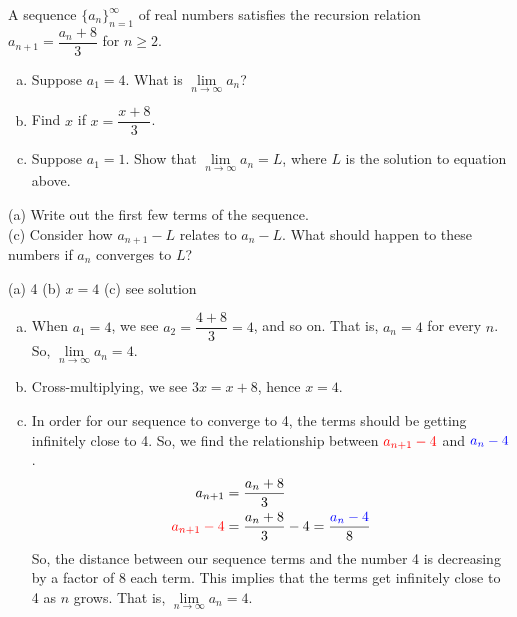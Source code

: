 \begin{question}
A sequence $\big\{a_n\big\}_{n=1}^\infty$ of real numbers satisfies the
recursion relation $a_{n+1} = \dfrac{a_n+8}{3}$ for $n\ge 2$.
\begin{enumerate}[(a)]
\item Suppose $a_1=4$. What is $\lim\limits_{n \to \infty}a_n$?
\item Find $x$ if  $x=\dfrac{x+8}{3}$.
\item Suppose $a_1=1$. Show that $\lim\limits_{n\rightarrow\infty} a_n = L$,
where $L$ is the solution to equation above.
\end{enumerate}
\end{question}

\begin{hint}
(a) Write out the first few terms of the sequence.\\
(c) Consider how $a_{n+1}-L$ relates to $a_{n}-L$. What should happen to these numbers if $a_n$ converges to $L$?
\end{hint}

\begin{answer}
(a) 4 \qquad (b) $x=4$\qquad
(c) see solution
\end{answer}

\begin{solution}
\begin{enumerate}[(a)]
\item When $a_1=4$, we see $a_2=\dfrac{4+8}{3}=4$, and so on. That is, $a_n=4$ for every $n$. So, $\lim\limits_{n \to \infty} a_n=4$.
\item Cross-multiplying, we see $3x=x+8$, hence $x=4$.
\item In order for our sequence to converge to 4, the terms should be getting infinitely close to 4. So, we find the relationship between $\textcolor{red}{a_{n+1}-4}$ and $\textcolor{blue}{a_n-4}$.
\begin{align*}
a_{n+1}&= \frac{a_n+8}{3} \\
\textcolor{red}{a_{n+1}-4}&= \frac{a_n+8}{3} -4=\frac{\textcolor{blue}{a_n-4}}{8}\\
\end{align*}
So, the distance between our sequence terms and the number 4 is decreasing by a factor of 8 each term. This implies that the terms get infinitely close to 4 as $n$ grows. That is, $\lim\limits_{n \to \infty}a_n=4$.
\end{enumerate}

\end{solution}

